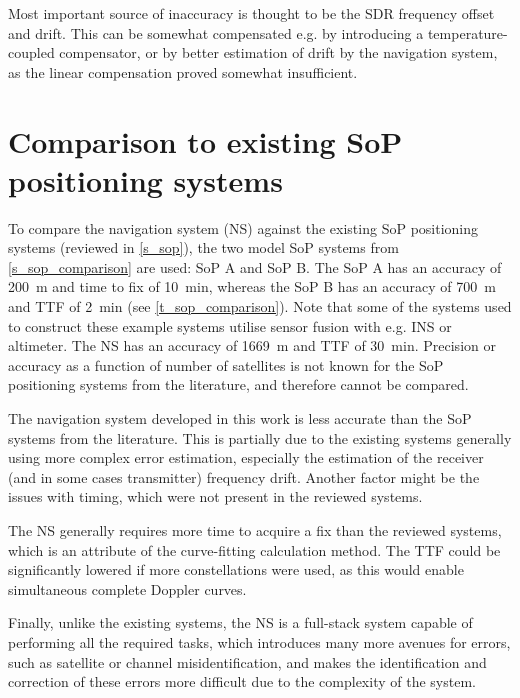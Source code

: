 Most important source of inaccuracy is thought to be the SDR frequency offset and drift. This can be somewhat compensated e.g. by introducing a temperature-coupled compensator, or by better estimation of drift by the navigation system, as the linear compensation proved somewhat insufficient.



\section{Comparison to existing SoP positioning systems}
To compare the navigation system (NS) against the existing SoP positioning systems (reviewed in \autoref{s_sop}), the two model SoP systems from \autoref{s_sop_comparison} are used: SoP A and SoP B. The SoP A has an accuracy of \qty{200}{m} and time to fix of \qty{10}{min}, whereas the SoP B has an accuracy of \qty{700}{m} and TTF of \qty{2}{min} (see \autoref{t_sop_comparison}). Note that some of the systems used to construct these example systems utilise sensor fusion with e.g. INS or altimeter. The NS has an accuracy of \qty{1669}{m} and TTF of \qty{30}{min}. Precision or accuracy as a function of number of satellites is not known for the SoP positioning systems from the literature, and therefore cannot be compared.

The navigation system developed in this work is less accurate than the SoP systems from the literature. This is partially due to the existing systems generally using more complex error estimation, especially the estimation of the receiver (and in some cases transmitter) frequency drift. Another factor might be the issues with timing, which were not present in the reviewed systems.

The NS generally requires more time to acquire a fix than the reviewed systems, which is an attribute of the curve-fitting calculation method. The TTF could be significantly lowered if more constellations were used, as this would enable simultaneous complete Doppler curves.

Finally, unlike the existing systems, the NS is a full-stack system capable of performing all the required tasks, which introduces many more avenues for errors, such as satellite or channel misidentification, and makes the identification and correction of these errors more difficult due to the complexity of the system.


